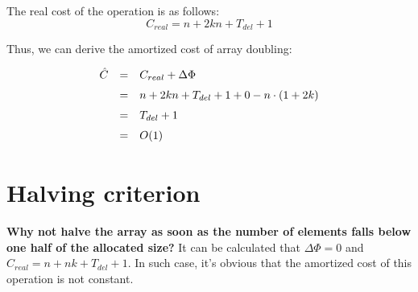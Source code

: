   The real cost of the operation is as follows:
  \[
  C_{real} = n + 2kn + T_{del} + 1
  \]

  Thus, we can derive the amortized cost of array doubling:
  \[
  \def\arraystretch{1.5}
  \begin{array}{lcl}
  \hat C & = & C_{real} + \Delta \Phi \\
         & = & n + 2kn + T_{del} + 1 + 0 - n \cdot (1 + 2k) \\
         & = & T_{del} + 1 \\
         & = & O(1)
  \end{array}
  \]

\section{Halving criterion}
  \textbf{Why not halve the array as soon as the number of elements falls below one half of the allocated size?}
  It can be calculated that $\Delta \Phi = 0$ and $C_{real} = n + nk + T_{del} + 1$. In such case, it's obvious that the amortized cost of this operation is not constant.
